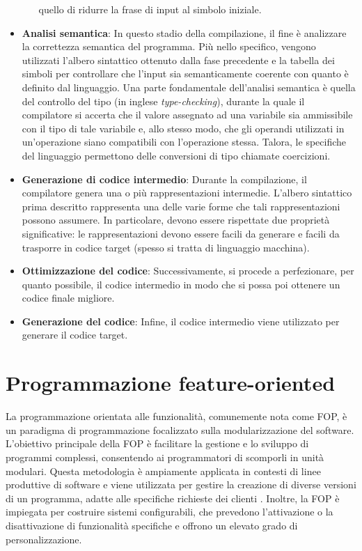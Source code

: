 \documentclass[12pt,a4paper,openright,twoside]{book}
\begin{document}
\begin{itemize}
\begin{itemize}
        quello di ridurre la frase di input al simbolo iniziale.
    \end{itemize}
    \item \textbf{Analisi semantica}: In questo stadio della compilazione, il fine è analizzare la correttezza semantica del programma. Più 
    nello specifico, vengono utilizzati l'albero sintattico ottenuto dalla fase precedente e la tabella dei simboli per controllare che 
    l'input sia semanticamente coerente con quanto è definito dal linguaggio. Una parte fondamentale dell'analisi semantica è quella del 
    controllo del tipo (in inglese \textit{type-checking}), durante la quale il compilatore si accerta che il valore assegnato ad una 
    variabile sia ammissibile con il tipo di tale variabile e, allo stesso modo, che gli operandi utilizzati in un’operazione siano 
    compatibili con l’operazione stessa. Talora, le specifiche del linguaggio permettono delle conversioni di tipo chiamate coercizioni.
    \item \textbf{Generazione di codice intermedio}: Durante la compilazione, il compilatore genera una o più rappresentazioni intermedie. 
    L'albero sintattico prima descritto rappresenta una delle varie forme che tali rappresentazioni possono assumere. In particolare, devono 
    essere rispettate due proprietà significative: le rappresentazioni devono essere facili da generare e facili da trasporre in codice 
    target (spesso si tratta di linguaggio macchina).
    \item \textbf{Ottimizzazione del codice}: Successivamente, si procede a perfezionare, per quanto possibile, il codice intermedio in modo 
    che si possa poi ottenere un codice finale migliore.
    \item \textbf{Generazione del codice}: Infine, il codice intermedio viene utilizzato per generare il codice target.
\end{itemize}

\section{Programmazione feature-oriented}
La programmazione orientata alle funzionalità, comunemente nota come \ac{FOP}, è un paradigma di programmazione focalizzato sulla modularizzazione 
del software. L’obiettivo principale della \ac{FOP} è facilitare la gestione e lo sviluppo di programmi complessi, consentendo ai programmatori 
di scomporli in unità modulari. Questa metodologia è ampiamente applicata in contesti di linee produttive di software e viene utilizzata per 
gestire la creazione di diverse versioni di un programma, adatte alle specifiche richieste dei clienti \cite{Apel2013}. Inoltre, la \ac{FOP} è 
impiegata per costruire sistemi configurabili, che prevedono l’attivazione o la disattivazione di funzionalità specifiche e offrono un elevato 
grado di personalizzazione.
\end{document}
